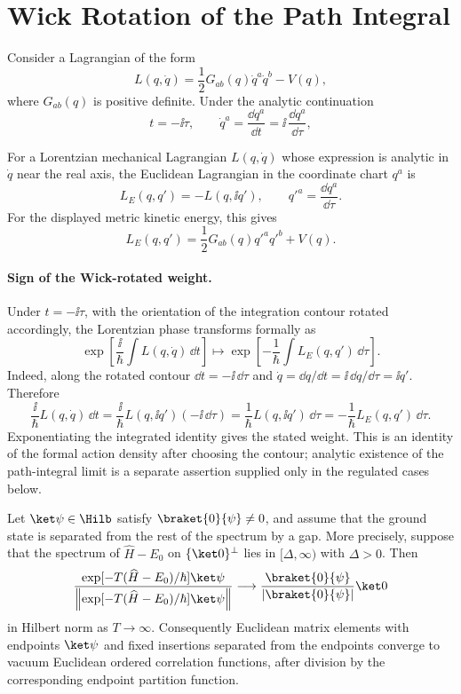 \section{Wick Rotation of the Path Integral}

Consider a Lagrangian of the form
\[
  L(q,\dot q)
  =
  \frac12G_{ab}(q)\dot q^a\dot q^b-V(q),
\]
where \(G_{ab}(q)\) is positive definite. Under the analytic continuation
\[
  t=-\ii\tau,\qquad
  \dot q^a=\frac{\dd q^a}{\dd t}
  =
  \ii\,\frac{\dd q^a}{\dd\tau},
\]
\begin{definition}
\label{def:euclidean-lagrangian-mechanics}
For a Lorentzian mechanical Lagrangian \(L(q,\dot q)\) whose expression is
analytic in \(\dot q\) near the real axis, the Euclidean Lagrangian in the
coordinate chart \(q^a\) is
\[
  L_E(q,q')
  =
  -L(q,\ii q'),
  \qquad q'^a=\frac{\dd q^a}{\dd\tau}.
\]
For the displayed metric kinetic energy, this gives
\[
  L_E(q,q')
  =
  \frac12G_{ab}(q)q'^aq'^b+V(q).
\]
\end{definition}

\paragraph{Sign of the Wick-rotated weight.}
Under \(t=-\ii\tau\), with the orientation of the integration contour rotated
accordingly, the Lorentzian phase transforms formally as
\[
  \exp\left[
    \frac{\ii}{\hbar}\int L(q,\dot q)\,\dd t
  \right]
  \longmapsto
  \exp\left[
    -\frac{1}{\hbar}\int L_E(q,q')\,\dd\tau
  \right].
\]
Indeed, along the rotated contour \(\dd t=-\ii\,\dd\tau\) and
\(\dot q=\dd q/\dd t=\ii\,\dd q/\dd\tau=\ii q'\).  Therefore
\[
  \frac{\ii}{\hbar}L(q,\dot q)\,\dd t
  =
  \frac{\ii}{\hbar}L(q,\ii q')(-\ii\,\dd\tau)
  =
  \frac{1}{\hbar}L(q,\ii q')\,\dd\tau
  =
  -\frac{1}{\hbar}L_E(q,q')\,\dd\tau .
\]
Exponentiating the integrated identity gives the stated weight.  This is an
identity of the formal action density after choosing the contour; analytic
existence of the path-integral limit is a separate assertion supplied only in
the regulated cases below.

\begin{lemma}
\label{lem:euclidean-long-time-vacuum-projection}
Let \(\ket\psi\in\Hilb\) satisfy \(\braket{0}{\psi}\ne0\), and assume that the
ground state is separated from the rest of the spectrum by a gap.  More
precisely, suppose that the spectrum of \(\widehat H-E_0\) on
\(\{\ket0\}^{\perp}\) lies in \([\Delta,\infty)\) with \(\Delta>0\).  Then
\[
  \frac{\exp[-T(\widehat H-E_0)/\hbar]\ket\psi}
       {\left\|\exp[-T(\widehat H-E_0)/\hbar]\ket\psi\right\|}
  \longrightarrow
  \frac{\braket{0}{\psi}}{|\braket{0}{\psi}|}\ket0
\]
in Hilbert norm as \(T\to\infty\).  Consequently Euclidean matrix elements
with endpoints \(\ket\psi\) and fixed insertions separated from the endpoints
converge to vacuum Euclidean ordered correlation functions, after division by
the corresponding endpoint partition function.
\end{lemma}

